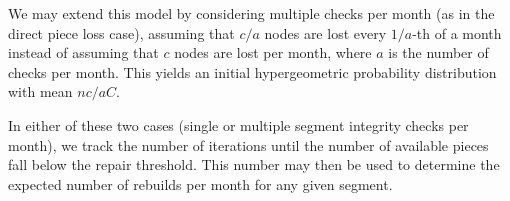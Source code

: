 We may extend this model by considering multiple checks per month (as in the direct piece loss case), assuming that $c/a$ nodes are lost every $1/a$-th of a month instead of assuming that $c$ nodes are lost per month, where $a$ is the number of checks per month. This yields an initial hypergeometric probability distribution with mean $nc/aC$.

In either of these two cases (single or multiple segment integrity checks per month), we track the number of iterations until the number of available pieces fall below the repair threshold. This number may then be used to determine the expected number of rebuilds per month for any given segment.
